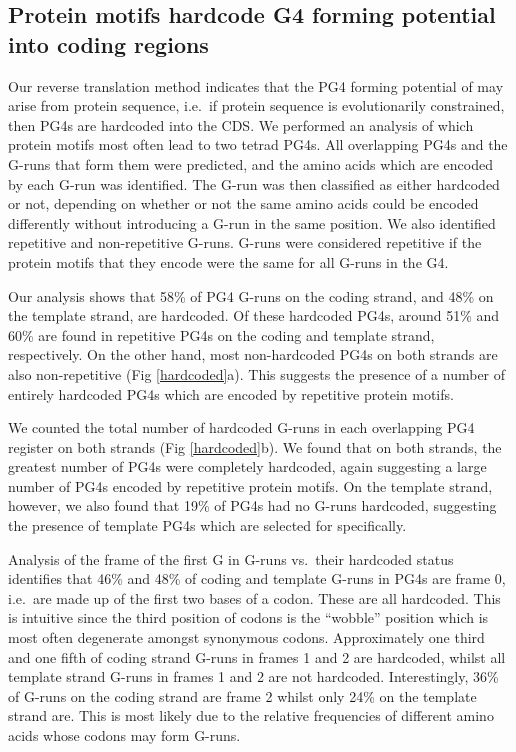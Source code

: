 \documentclass[12pt,a4paper,]{report}
\begin{document}
\newpage

\hypertarget{protein-motifs-hardcode-g4-forming-potential-into-coding-regions}{%
\subsection{Protein motifs hardcode G4 forming potential into coding
regions}\label{protein-motifs-hardcode-g4-forming-potential-into-coding-regions}}

Our reverse translation method indicates that the PG4 forming potential
of may arise from protein sequence, i.e.~if protein sequence is
evolutionarily constrained, then PG4s are hardcoded into the CDS. We
performed an analysis of which protein motifs most often lead to two
tetrad PG4s. All overlapping PG4s and the G-runs that form them were
predicted, and the amino acids which are encoded by each G-run was
identified. The G-run was then classified as either hardcoded or not,
depending on whether or not the same amino acids could be encoded
differently without introducing a G-run in the same position. We also
identified repetitive and non-repetitive G-runs. G-runs were considered
repetitive if the protein motifs that they encode were the same for all
G-runs in the G4.

Our analysis shows that 58\% of PG4 G-runs on the coding strand, and
48\% on the template strand, are hardcoded. Of these hardcoded PG4s,
around 51\% and 60\% are found in repetitive PG4s on the coding and
template strand, respectively. On the other hand, most non-hardcoded
PG4s on both strands are also non-repetitive (Fig \ref{hardcoded}a).
This suggests the presence of a number of entirely hardcoded PG4s which
are encoded by repetitive protein motifs.

We counted the total number of hardcoded G-runs in each overlapping PG4
register on both strands (Fig \ref{hardcoded}b). We found that on both
strands, the greatest number of PG4s were completely hardcoded, again
suggesting a large number of PG4s encoded by repetitive protein motifs.
On the template strand, however, we also found that 19\% of PG4s had no
G-runs hardcoded, suggesting the presence of template PG4s which are
selected for specifically.

Analysis of the frame of the first G in G-runs vs.~their hardcoded
status identifies that 46\% and 48\% of coding and template G-runs in
PG4s are frame 0, i.e.~are made up of the first two bases of a codon.
These are all hardcoded. This is intuitive since the third position of
codons is the ``wobble'' position which is most often degenerate amongst
synonymous codons. Approximately one third and one fifth of coding
strand G-runs in frames 1 and 2 are hardcoded, whilst all template
strand G-runs in frames 1 and 2 are not hardcoded. Interestingly, 36\%
of G-runs on the coding strand are frame 2 whilst only 24\% on the
template strand are. This is most likely due to the relative frequencies
of different amino acids whose codons may form G-runs.
\end{document}
